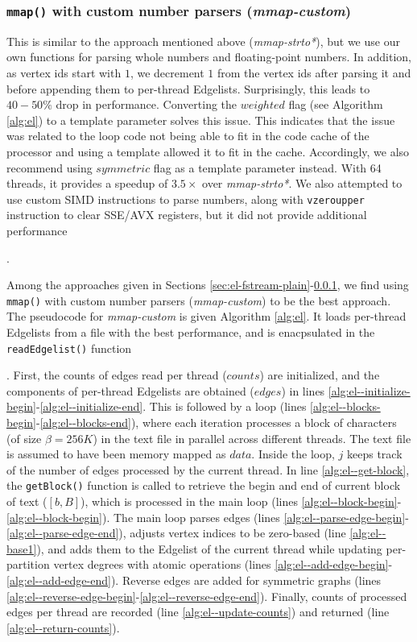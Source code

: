 


\subsubsection{\texttt{mmap()} with custom number parsers (\textit{mmap-custom})}
\label{sec:el-mmap-custom}

This is similar to the approach mentioned above (\textit{mmap-strto*}), but we use our own functions for parsing whole numbers and floating-point numbers. In addition, as vertex ids start with $1$, we decrement $1$ from the vertex ids after parsing it and before appending them to per-thread Edgelists. Surprisingly, this leads to $40-50\%$ drop in performance. Converting the $weighted$ flag (see Algorithm \ref{alg:el}) to a template parameter solves this issue. This indicates that the issue was related to the loop code not being able to fit in the code cache of the processor and using a template allowed it to fit in the cache. Accordingly, we also recommend using $symmetric$ flag as a template parameter instead. With 64 threads, it provides a speedup of $3.5\times$ over \textit{mmap-strto*}. We also attempted to use custom SIMD instructions to parse numbers, along with \texttt{vzeroupper} instruction to clear SSE/AVX registers, but it did not provide additional performance.

Among the approaches given in Sections \ref{sec:el-fstream-plain}-\ref{sec:el-mmap-custom}, we find using \texttt{mmap()} with custom number parsers (\textit{mmap-custom}) to be the best approach. The pseudocode for \textit{mmap-custom} is given Algorithm \ref{alg:el}. It loads per-thread Edgelists from a file with the best performance, and is enacpsulated in the \texttt{readEdgelist()} function. First, the counts of edges read per thread ($counts$) are initialized, and the components of per-thread Edgelists are obtained ($edges$) in lines \ref{alg:el--initialize-begin}-\ref{alg:el--initialize-end}. This is followed by a loop (lines \ref{alg:el--blocks-begin}-\ref{alg:el--blocks-end}), where each iteration processes a block of characters (of size $\beta = 256K$) in the text file in parallel across different threads. The text file is assumed to have been memory mapped as $data$. Inside the loop, $j$ keeps track of the number of edges processed by the current thread. In line \ref{alg:el--get-block}, the \texttt{getBlock()} function is called to retrieve the begin and end of current block of text ($[b, B]$), which is processed in the main loop (lines \ref{alg:el--block-begin}-\ref{alg:el--block-begin}). The main loop parses edges (lines \ref{alg:el--parse-edge-begin}-\ref{alg:el--parse-edge-end}), adjusts vertex indices to be zero-based (line \ref{alg:el--base1}), and adds them to the Edgelist of the current thread while updating per-partition vertex degrees with atomic operations (lines \ref{alg:el--add-edge-begin}-\ref{alg:el--add-edge-end}). Reverse edges are added for symmetric graphs (lines \ref{alg:el--reverse-edge-begin}-\ref{alg:el--reverse-edge-end}). Finally, counts of processed edges per thread are recorded (line \ref{alg:el--update-counts}) and returned (line \ref{alg:el--return-counts}).

